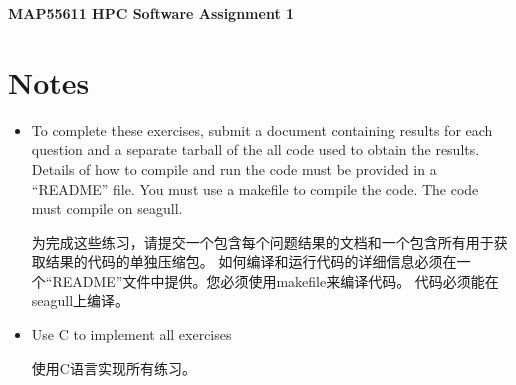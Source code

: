 \documentclass{article}
\begin{document}
\begin{center}
    \Large \textbf{MAP55611 HPC Software Assignment 1}
\end{center}
\section{Notes}
\begin{itemize}
    \item To complete these exercises, submit a document containing results for each 
    question and a separate tarball of the all code used to obtain the results. 
    Details of how to compile and run the code must be provided in a “README” file. 
    You must use a makefile to compile the code. The code must compile on seagull.

    为完成这些练习，请提交一个包含每个问题结果的文档和一个包含所有用于获取结果的代码的单独压缩包。
    如何编译和运行代码的详细信息必须在一个“README”文件中提供。您必须使用makefile来编译代码。
    代码必须能在seagull上编译。
    \item Use C to implement all exercises
    
    使用C语言实现所有练习。
\end{itemize}
\end{document}
